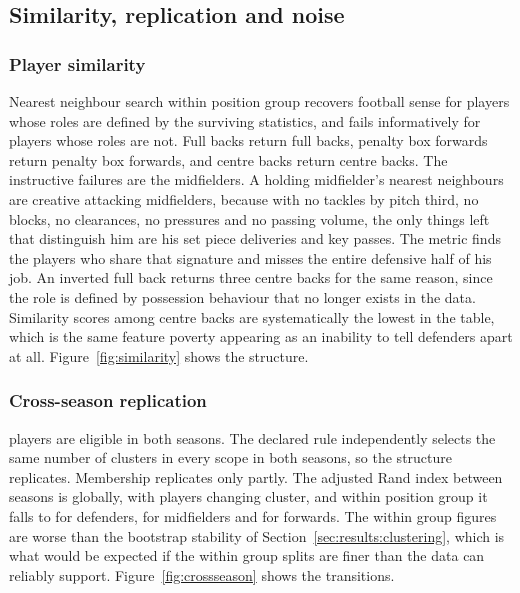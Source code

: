 \subsection{Similarity, replication and noise}
\label{sec:results:novel}

\subsubsection{Player similarity}
Nearest neighbour search within position group recovers football sense for players whose
roles are defined by the surviving statistics, and fails informatively for players whose
roles are not. Full backs return full backs, penalty box forwards return penalty box
forwards, and centre backs return centre backs. The instructive failures are the
midfielders. A holding midfielder's nearest neighbours are creative attacking midfielders,
because with no tackles by pitch third, no blocks, no clearances, no pressures and no
passing volume, the only things left that distinguish him are his set piece deliveries and
key passes. The metric finds the players who share that signature and misses the entire
defensive half of his job. An inverted full back returns three centre backs for the same
reason, since the role is defined by possession behaviour that no longer exists in the
data. Similarity scores among centre backs are systematically the lowest in the table,
which is the same feature poverty appearing as an inability to tell defenders apart at
all. Figure~\ref{fig:similarity} shows the structure.

\subsubsection{Cross-season replication}
\NCommonPlayers{} players are eligible in both seasons. The declared rule independently
selects the same number of clusters in every scope in both seasons, so the structure
replicates. Membership replicates only partly. The adjusted Rand index between seasons is
\CrossSeasonARIGlobal{} globally, with \CrossSeasonChangedGlobal{} players changing
cluster, and within position group it falls to \CrossSeasonARIDF{} for defenders,
\CrossSeasonARIMF{} for midfielders and \CrossSeasonARIFW{} for forwards. The within group
figures are worse than the bootstrap stability of Section~\ref{sec:results:clustering},
which is what would be expected if the within group splits are finer than the data can
reliably support. Figure~\ref{fig:crossseason} shows the transitions.

